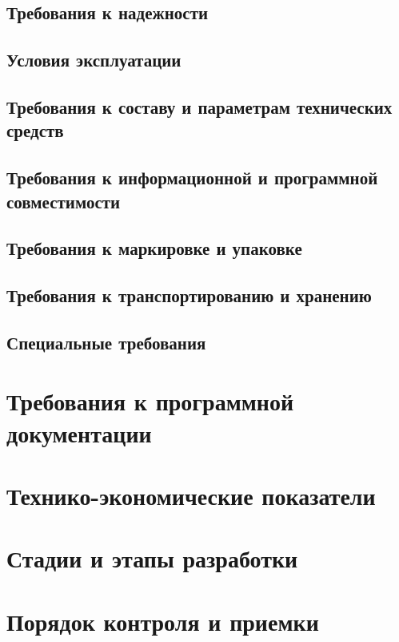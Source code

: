 \documentclass[techtask]{espd}
\begin{document}
\subsection{Требования к надежности}
\subsection{Условия эксплуатации}
\subsection{Требования к составу и параметрам технических средств}
\subsection{Требования к информационной и программной совместимости}
\subsection{Требования к маркировке и упаковке}
\subsection{Требования к транспортированию и хранению}
\subsection{Специальные требования}

\section{Требования к программной документации}
\section{Технико-экономические показатели}
\section{Стадии и этапы разработки}
\section{Порядок контроля и приемки}


\end{document}
